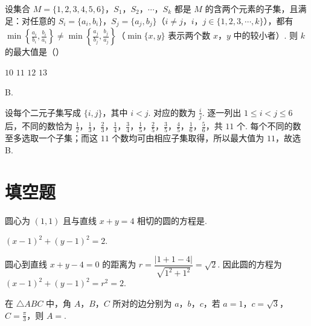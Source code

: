 \begin{problem}
设集合 \(M = \{1, 2, 3, 4, 5, 6\}\)，\(S_1\)，\(S_2\)，\(\cdots\)，\(S_k\) 都是 \(M\) 的含两个元素的子集，且满足：对任意的 \(S_i = \{a_i, b_i\}\)，\(S_j = \{a_j, b_j\}\)（\(i \neq j\)，\(i\)，\(j \in \{1, 2, 3, \cdots, k\}\)），都有 \(\min \left\{\frac{a_i}{b_i}, \frac{b_i}{a_i}\right\} \neq \min \left\{\frac{a_j}{b_j}, \frac{b_j}{a_j}\right\}\)（\(\min \{x, y\}\) 表示两个数 \(x\)，\(y\) 中的较小者）. 则 \(k\) 的最大值是（\quad）

\choices
    {\(10\)}
    {\(11\)}
    {\(12\)}
    {\(13\)}
\end{problem}

\begin{answer}
B.
\end{answer}

\begin{solution}
设每个二元子集写成 \(\{i,j\}\)，其中 \(i<j\). 对应的数为 \(\frac{i}{j}\). 逐一列出 \(1\leqslant i<j\leqslant6\) 后，不同的数恰为
\(\frac12\)，\(\frac13\)，\(\frac23\)，\(\frac14\)，\(\frac34\)，\(\frac15\)，\(\frac25\)，\(\frac35\)，\(\frac45\)，\(\frac16\)，\(\frac56\)，共 \(11\) 个. 每个不同的数至多选取一个子集；而这 \(11\) 个数均可由相应子集取得，所以最大值为 \(11\)，故选 B.
\end{solution}

\section{填空题}

\begin{problem}
圆心为 \((1,1)\) 且与直线 \(x + y = 4\) 相切的圆的方程是\fillinblank{}.
\end{problem}

\begin{answer}
\(\left(x-1\right)^2+\left(y-1\right)^2=2\).
\end{answer}

\begin{solution}
圆心到直线 \(x+y-4=0\) 的距离为
\(r=\dfrac{|1+1-4|}{\sqrt{1^{2}+1^{2}}}=\sqrt2\). 因此圆的方程为 \((x-1)^{2}+(y-1)^{2}=r^{2}=2\).
\end{solution}

\begin{problem}
在 \(\triangle ABC\) 中，角 \(A\)，\(B\)，\(C\) 所对的边分别为 \(a\)，\(b\)，\(c\)，若 \(a = 1\)，\(c = \sqrt{3}\)，\(C = \frac{\pi}{3}\)，则 \(A =\)\fillinblank{}.
\end{problem}


